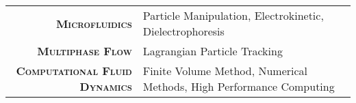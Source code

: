 
\vspace{10pt}

\begin{tabular}{rl}
  \textsc{\textbf{Microfluidics}} & Particle Manipulation, Electrokinetic, Dielectrophoresis \\
  \textsc{\textbf{Multiphase Flow}} & Lagrangian Particle Tracking \\
  \textsc{\textbf{Computational Fluid Dynamics}} & Finite Volume Method, Numerical Methods, High Performance Computing
\end{tabular}
